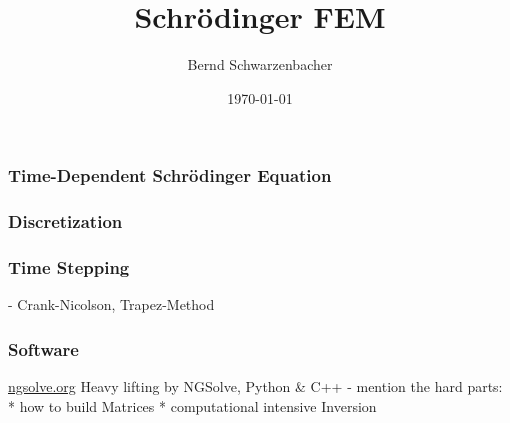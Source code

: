 \documentclass{beamer}
\title[Simulating the Schrödinger Equation with Finite Elements]{Schrödinger FEM}
\author{Bernd Schwarzenbacher}
\institute[KTH]
{Stockholm \\
\medskip
}
\date{\today}
\begin{document}
\begin{frame}
  \frametitle{Time-Dependent Schrödinger Equation}
\end{frame}

\begin{frame}
  \frametitle{Discretization}
\end{frame}

\begin{frame}
  \frametitle{Time Stepping}
- Crank-Nicolson, Trapez-Method
\end{frame}

\begin{frame}
  \frametitle{Software}
  \url{ngsolve.org}
  Heavy lifting by NGSolve, Python \& C++
- mention the hard parts:
 * how to build Matrices
 * computational intensive Inversion
\end{frame}    
\end{document}
